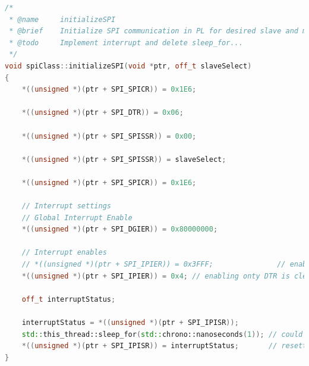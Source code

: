 \documentclass[a4paper, twoside, 11pt]{article}
\newcommand{\fbar}{\FloatBarrier}
\begin{document}
\begin{lstlisting}[language={c++}, caption={Algoritmus inicializace \gls{abbreviation:axi} Quad \gls{abbreviation:spi} jednotky v~C++.}, label={lst:initialize-spi}]
/*
 * @name     initializeSPI
 * @brief    Initialize SPI communication in PL for desired slave and mapped device.
 * @todo     Implement interrupt and delete sleep_for...
 */
void spiClass::initializeSPI(void *ptr, off_t slaveSelect)
{
    *((unsigned *)(ptr + SPI_SPICR)) = 0x1E6;

    *((unsigned *)(ptr + SPI_DTR)) = 0x06;

    *((unsigned *)(ptr + SPI_SPISSR)) = 0x00;

    *((unsigned *)(ptr + SPI_SPISSR)) = slaveSelect;

    *((unsigned *)(ptr + SPI_SPICR)) = 0x1E6;

    // Interrupt settings
    // Global Interrupt Enable
    *((unsigned *)(ptr + SPI_DGIER)) = 0x80000000;

    // Interrupt enables
    // *((unsigned *)(ptr + SPI_IPIER)) = 0x3FFF;               // enabling all interrupts
    *((unsigned *)(ptr + SPI_IPIER)) = 0x4; // enabling onty DTR is clear INT

    off_t interruptStatus;

    interruptStatus = *((unsigned *)(ptr + SPI_IPISR));
    std::this_thread::sleep_for(std::chrono::nanoseconds(1)); // could not resolve other way now, because reading and writing to register takes more time that one tick probably
    *((unsigned *)(ptr + SPI_IPISR)) = interruptStatus;       // resetting SPI interrupt status register
}\end{lstlisting}

	\fbar
\end{document}
